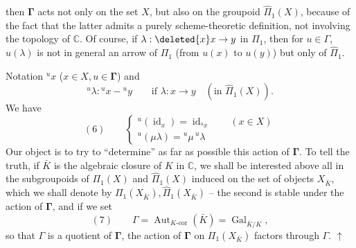 then $\mathbf{\Gamma}$ acts not only on  the set $X$, but also on the groupoid $\widehat\Pi_1(X)$, because of the fact that the latter admits a purely scheme-theoretic definition, not involving the topology of $\mathbb C$. Of course, if $\lambda:\deleted{x} x\to y$ in $\Pi_1$, then for $u\in\Gamma$, $u(\lambda)$ is not in general an arrow of $\Pi_1$ (from $u(x)$ to $u(y)$) but only of $\widehat\Pi_1$.

 Notation ${}^ux$ ($x\in X,u\in\mathbf{\Gamma}$) and 
\[
{}^u\lambda:{}^ux-{}^uy\qquad\text{if }\lambda:x\to y\quad(\text{in }\widehat\Pi_1(X)).
\]
We have
\[
(6)\qquad\begin{cases}
{}^u(\operatorname{id}_x)=\operatorname{id}_{{}^ux}\qquad(x\in X)\\
{}^u(\mu\lambda)={}^u\mu\,{}^u\lambda
\end{cases}
\]
Our object is to try to ``determine'' as far as possible this action of $\mathbf{\Gamma}$. To tell the truth, if $\bar K$ is the algebraic closure of $K$ in $\mathbb C$, we shall be interested above all in the subgroupoids of $\Pi_1(X)$ and $\widehat\Pi_1(X)$ induced on the set of objects $X_{\bar K}$, which we shall denote by $\Pi_1(X_{\bar K}),\widehat\Pi_1(X_{\bar K})$ -- the second is stable under the action of $\mathbf{\Gamma}$, and if we set
\[
(7)\qquad\Gamma=\operatorname{Aut}_{K\text{-cor}}(\bar K)=\operatorname{Gal}_{\bar K/K},
\]
so that $\Gamma$ is a quotient of $\mathbf{\Gamma}$, the action of $\mathbf{\Gamma}$ on $\Pi_1(X_{\bar K})$ factors through $\Gamma$. $\uparrow$
